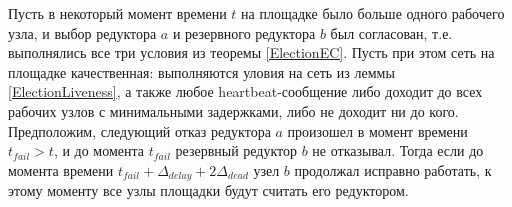 \begin{theorem}
\label{ReelectionTheorem}
    Пусть в некоторый момент времени $t$ на площадке было больше одного рабочего узла, и выбор редуктора $a$ и резервного редуктора $b$ был согласован, т.е. выполнялись все три условия из теоремы \ref{ElectionEC}. Пусть при этом сеть на площадке качественная: выполняются уловия на сеть из леммы \ref{ElectionLiveness}, а также любое heartbeat-со\-об\-ще\-ние либо доходит до всех рабочих узлов с минимальными задержками, либо не доходит ни до кого. Предположим, следующий отказ редуктора $a$ произошел в момент времени $t_{fail} > t$, и до момента $t_{fail}$ резервный редуктор $b$ не отказывал. Тогда если до момента времени $t_{fail} + \Delta_{delay} + 2\Delta_{dead}$ узел $b$ продолжал исправно работать, к этому моменту все узлы площадки будут считать его редуктором.
\end{theorem}
